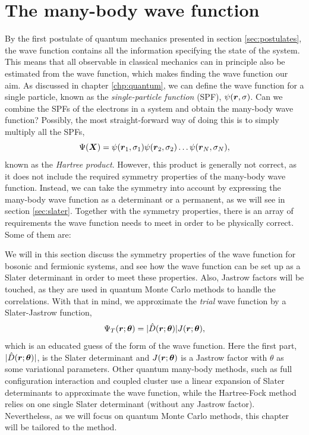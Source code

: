 \section{The many-body wave function} \label{sec:wavefunction}
By the first postulate of quantum mechanics presented in section \ref{sec:postulates}, the wave function contains all the information specifying the state of the system. This means that all observable in classical mechanics can in principle also be estimated from the wave function, which makes finding the wave function our aim. As discussed in chapter \ref{chp:quantum}, we can define the wave function for a single particle, known as the \textit{single-particle function} (SPF), $\psi(\boldsymbol{{r}},\sigma)$. Can we combine the SPFs of the electrons in a system and obtain the many-body wave function? Possibly, the most straight-forward way of doing this is to simply multiply all the SPFs,
\begin{equation}
\Psi(\boldsymbol{{X}})=\psi(\boldsymbol{{r}}_1,\sigma_1)\psi(\boldsymbol{{r}}_2,\sigma_2)\hdots\psi(\boldsymbol{{r}}_N,\sigma_N),
\end{equation}
known as the \textit{Hartree product}. However, this product is generally not correct, as it does not include the required symmetry properties of the many-body wave function. Instead, we can take the symmetry into account by expressing the many-body wave function as a determinant or a permanent, as we will see in section \ref{sec:slater}. Together with the symmetry properties, there is an array of requirements the wave function needs to meet in order to be physically correct. Some of them are:

\iffalse
We will in this section discuss the symmetry properties of the wave function for bosonic and fermionic systems, and see how the wave function can be set up as a Slater determinant in order to meet these properties. Also, Jastrow factors will be touched, as they are used in quantum Monte Carlo methods to handle the correlations. With that in mind, we approximate the \textit{trial} wave function by a Slater-Jastrow function,
\begin{equation}
\Psi_T(\boldsymbol{{r}};\boldsymbol{{\theta}})=|\hat{D}(\boldsymbol{{r}};\boldsymbol{{\theta}})|J(\boldsymbol{{r}};\boldsymbol{{\theta}}),
\end{equation}
which is an educated guess of the form of the wave function. 
Here the first part, $|\hat{D}(\boldsymbol{{r}};\boldsymbol{{\theta}})|$, is the Slater determinant and $J(\boldsymbol{{r}};\boldsymbol{{\theta}})$ is a Jastrow factor with $\theta$ as some variational parameters. Other quantum many-body methods, such as full configuration interaction and coupled cluster use a linear expansion of Slater determinants to approximate the wave function, while the Hartree-Fock method relies on one single Slater determinant (without any Jastrow factor). Nevertheless, as we will focus on quantum Monte Carlo methods, this chapter will be tailored to the method. 

